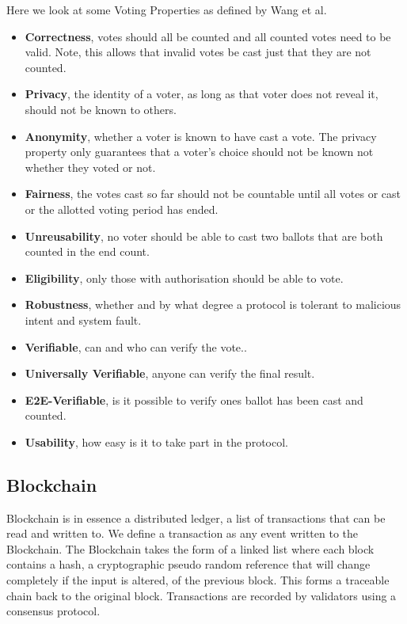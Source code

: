 \documentclass{entcs}
\begin{document}
Here we look at some Voting Properties as defined by Wang et al. \cite{RequirementOfEVoting}
\begin{itemize}
  \item {\bfseries Correctness}, votes should all be counted and all counted votes need to be valid. Note, this allows that invalid votes be cast just that they are not counted.
  \item {\bfseries Privacy}, the identity of a voter, as long as that voter does not reveal it, should not be known to others.
  \item {\bfseries Anonymity}, whether a voter is known to have cast a vote. The privacy property only guarantees that a voter's choice should not be known not whether they voted or not.
  \item {\bfseries Fairness}, the votes cast so far should not be countable until all votes or cast or the allotted voting period has ended.
  \item {\bfseries Unreusability}, no voter should be able to cast two ballots that are both counted in the end count.
  \item {\bfseries Eligibility}, only those with authorisation should be able to vote.
  \item {\bfseries Robustness}, whether and by what degree a protocol is tolerant to malicious intent and system fault.
  \item {\bfseries Verifiable}, can and who can verify the vote..
  \item {\bfseries Universally Verifiable}, anyone can verify the final result. 
  \item {\bfseries E2E-Verifiable}, is it possible to verify ones ballot has been cast and counted.
  \item {\bfseries Usability}, how easy is it to take part in the protocol.
\end{itemize}

\subsection{Blockchain}
Blockchain is in essence a distributed ledger, a list of transactions that can be read and written to. We define a transaction as any event written to the Blockchain. The Blockchain takes the form of a linked list \cite{blockchainBeginners} where each block contains a hash, a cryptographic pseudo random reference that will change completely if the input is altered, of the previous block. This forms a traceable chain back to the original block. Transactions are recorded by validators using a consensus protocol.
\end{document}

